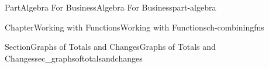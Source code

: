 \documentclass[oneside,10pt,]{tufte-book}
\numberwithin{equation}{chapter}
\def \tikzhistogram (#1,#2){\draw[fill=blue,opacity=0.3] ({#1+((\xtwo-\xmin)/5)},#2) rectangle ({#1-((\xtwo-\xmin)/5)},0); \draw[draw,thick] ({#1+((\xtwo-\xmin)/5)},#2) rectangle ({#1-((\xtwo-\xmin)/5)},0); \node[draw,fill=blue, circle,inner sep=2.5pt] at (#1,#2) {};}
\begin{document}
\begin{partptx}{Part}{Algebra For Business}{}{Algebra For Business}{}{}{part-algebra}
\begin{chapterptx}{Chapter}{Working with Functions}{}{Working with Functions}{}{}{ch-combiningfns}
\begin{sectionptx}{Section}{\textasteriskcentered{}Graphs of Totals and Changes}{}{\textasteriskcentered{}Graphs of Totals and Changes}{}{}{sec_graphsoftotalsandchanges}
\begin{image}{0}{1}{0}{}
{                    %
                    \def \tikzhistogram (#1,#2){\draw[fill=blue,opacity=0.3] ({#1+0.45},#2) rectangle ({#1-0.45},0); \draw[draw,thick] ({#1+0.45},#2) rectangle ({#1-0.45},0); \node[draw,fill=blue, circle,inner sep=2pt] at (#1,#2) {};}
                    \def \xmin {0}
                    \def \xmax {7}
                    \def \xunits {day}
                    \def \yunits {cost}
                    \def \dyunits{change in cost}
                    \def \ymin {0}								%
                    \def \ysecondmajoraxis {1}		%
                    \def \yfirstminoraxis  {0.5}	%
                    \def \ysecondminoraxis {1.5}	%
                    \def \ymax {6}
                    \def \dymin {-3}
                    \def \dysecondmajoraxis {-2}
                    \def \dyfirstminoraxis  {-2.5}
                    \def \dysecondminoraxis {-1.5}
                    \def \dymax {3}
                    \def \xscale {0.8*0.8}
                    \def \dyscale {0.6}
                    }
\end{image}
\end{sectionptx}
\end{chapterptx}
\end{partptx}
\end{document}
